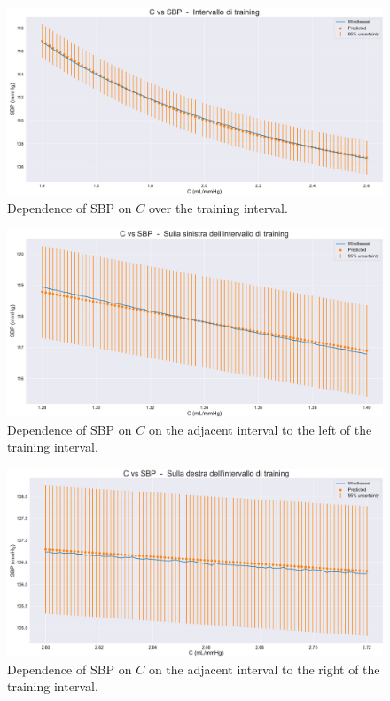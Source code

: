 \vspace{0.32cm}

\begin{figure}[!htb]
    \centering
    \includegraphics[width=1\textwidth]{images/Training (risultati)/SBP/SBP - C - training.pdf}
    \caption{Dependence of SBP on $C$ over the training interval.}
    \label{SBP - C - training}
\end{figure}

\begin{figure}
    \centering
    \includegraphics[width=1\textwidth]{images/Training (risultati)/SBP/SBP - C - sx.pdf}
    \caption{Dependence of SBP on $C$ on the adjacent interval to the left of the training interval.}
    \label{SBP - C - sx}
\end{figure}


\begin{figure}
    \centering
    \includegraphics[width=1\textwidth]{images/Training (risultati)/SBP/SBP - C - dx.pdf}
    \caption{Dependence of SBP on $C$ on the adjacent interval to the right of the training interval.}
    \label{SBP - C - dx}
\end{figure}



